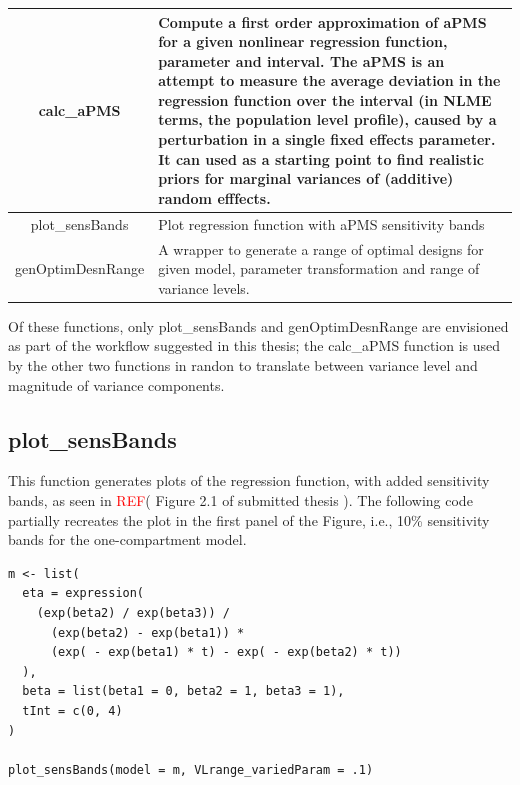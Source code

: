 \documentclass{article}
\newcommand*{\REF}{\textcolor{red}{REF}}
\theoremstyle{example}
\begin{document}
\begin{center}
	\begin{tabular}{| c | p{8cm} |}
		\hline
		\textsf{calc\_aPMS} & Compute a first order approximation of aPMS for a given nonlinear regression function, parameter and interval. The aPMS is an attempt to measure the average deviation in the regression function over the interval (in NLME terms, the population level profile), caused by a perturbation in a single fixed effects parameter. It can used as a starting point to find realistic priors for marginal variances of (additive) random efffects. 
		\\ \hline
		\textsf{plot\_sensBands} & Plot regression function with aPMS sensitivity bands 
		\\ \hline
		\textsf{genOptimDesnRange} & A wrapper to generate a range of optimal designs for given model, parameter transformation and range of variance levels. 
		\\ \hline
	\end{tabular}
\end{center}

Of these functions, only \textsf{plot\_sensBands} and \textsf{genOptimDesnRange} are envisioned as part of the workflow suggested in this thesis; the \textsf{calc\_aPMS} function is used by the other two functions in \textsf{randon} to translate between variance level and magnitude of variance components.

    \subsection{\textsf{plot\_sensBands}}
    
    
    
    This function generates plots of the regression function, with added sensitivity bands, as seen in \REF ( Figure 2.1 of submitted thesis ).
    The following code partially recreates the plot in the first panel of the Figure, i.e., 10\% sensitivity bands for the one-compartment  model.
           
    \begin{verbatim}
m <- list(
  eta = expression(
    (exp(beta2) / exp(beta3)) /
      (exp(beta2) - exp(beta1)) *
      (exp( - exp(beta1) * t) - exp( - exp(beta2) * t))
  ),
  beta = list(beta1 = 0, beta2 = 1, beta3 = 1),
  tInt = c(0, 4)
)

plot_sensBands(model = m, VLrange_variedParam = .1)
    \end{verbatim}
\end{document}
